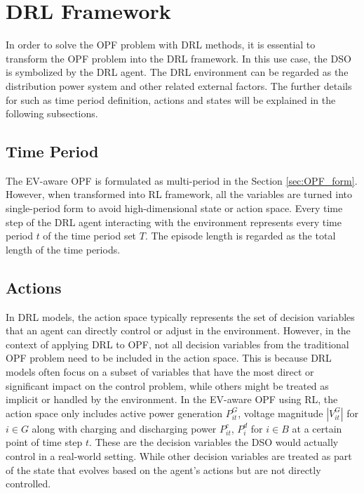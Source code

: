 \section{\acrlong{DRL} Framework}\label{sec:RL Framework}
In order to solve the \gls{OPF} problem with \gls{DRL} methods, it is essential to transform the \gls{OPF} problem into the \gls{DRL} framework. In this use case, the \gls{DSO} is symbolized by the \gls{DRL} agent. The \gls{DRL} environment can be regarded as the distribution power system and other related external factors. The further details for such as time period definition, actions and states will be explained in the following subsections.

\subsection{Time Period}
The EV-aware \gls{OPF} is formulated as multi-period in the Section \ref{sec:OPF_form}. However, when transformed into \gls{RL} framework, all the variables are turned into single-period form to avoid high-dimensional state or action space. Every time step of the \gls{DRL} agent interacting with the environment represents every time period $t$ of the time period set $T$. The episode length is regarded as the total length of the time periods.

\subsection{Actions}
In \gls{DRL} models, the action space typically represents the set of decision variables that an agent can directly control or adjust in the environment. However, in the context of applying \gls{DRL} to \gls{OPF}, not all decision variables from the traditional \gls{OPF} problem need to be included in the action space. This is because \gls{DRL} models often focus on a subset of variables that have the most direct or significant impact on the control problem, while others might be treated as implicit or handled by the environment. In the EV-aware \gls{OPF} using RL, the action space only includes active power generation $P_{it}^G$, voltage magnitude $|V_{it}^G|$ for $i \in G$ along with charging and discharging power $P_{it}^c$,  $P_{i}^d$ for $i \in B$ at a certain point of time step $t$. These are the decision variables the \gls{DSO} would actually control in a real-world setting. While other decision variables are treated as part of the state that evolves based on the agent's actions but are not directly controlled.

